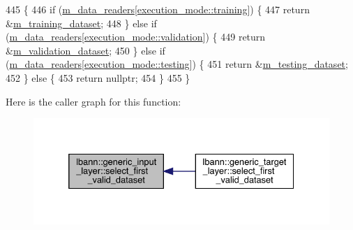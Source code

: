 \begin{DoxyCode}
445                                                  \{
446     \textcolor{keywordflow}{if} (\hyperlink{classlbann_1_1generic__input__layer_a6bc18860c02beed0252ea3cc87bc48d2}{m\_data\_readers}[\hyperlink{base_8hpp_a2781a159088df64ed7d47cc91c4dc0a8ac185ddac8b5a8f5aa23c5b80bc12d214}{execution\_mode::training}]) \{
447       \textcolor{keywordflow}{return} &\hyperlink{classlbann_1_1generic__input__layer_a23716635b1062bfe57f7fcf75140a63a}{m\_training\_dataset};
448     \} \textcolor{keywordflow}{else} \textcolor{keywordflow}{if} (\hyperlink{classlbann_1_1generic__input__layer_a6bc18860c02beed0252ea3cc87bc48d2}{m\_data\_readers}[\hyperlink{base_8hpp_a2781a159088df64ed7d47cc91c4dc0a8aa617908b172c473cb8e8cda059e55bf0}{execution\_mode::validation}]) \{
449       \textcolor{keywordflow}{return} &\hyperlink{classlbann_1_1generic__input__layer_abd70adf607d1cef87fb6641af77e816d}{m\_validation\_dataset};
450     \} \textcolor{keywordflow}{else} \textcolor{keywordflow}{if} (\hyperlink{classlbann_1_1generic__input__layer_a6bc18860c02beed0252ea3cc87bc48d2}{m\_data\_readers}[\hyperlink{base_8hpp_a2781a159088df64ed7d47cc91c4dc0a8aae2b1fca515949e5d54fb22b8ed95575}{execution\_mode::testing}]) \{
451       \textcolor{keywordflow}{return} &\hyperlink{classlbann_1_1generic__input__layer_a66b9ec6b393695232bd98edc62fc1348}{m\_testing\_dataset};
452     \} \textcolor{keywordflow}{else} \{
453       \textcolor{keywordflow}{return} \textcolor{keyword}{nullptr};
454     \}
455   \}
\end{DoxyCode}
Here is the caller graph for this function\+:\nopagebreak
\begin{figure}[H]
\begin{center}
\leavevmode
\includegraphics[width=332pt]{classlbann_1_1generic__input__layer_a777aa11816a518098212408b569b6fb8_icgraph}
\end{center}
\end{figure}
\mbox{\label{classlbann_1_1generic__input__layer_a8ca316b0369689949f3f4106920ec28f}} 
